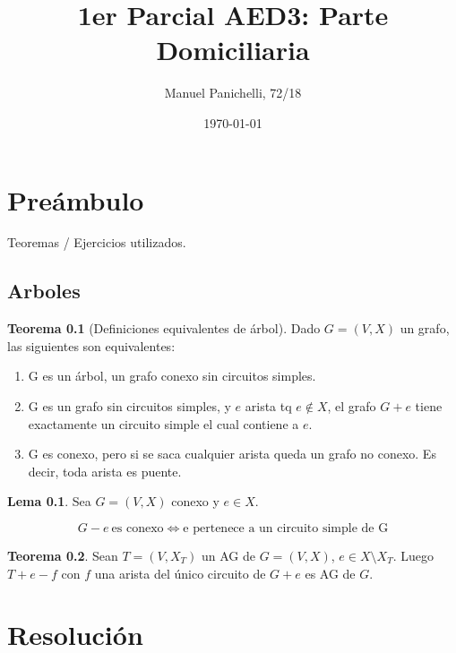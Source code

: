 \documentclass[12pt, a4paper]{report}
\title{1er Parcial AED3: Parte Domiciliaria}
\author{Manuel Panichelli, 72/18}
\date{\today}
\theoremstyle{definition} %
\newtheorem{theorem}{Teorema}
\newtheorem{lemma}{Lema}
\begin{document}
\maketitle
\newpage

\chapter*{Preámbulo}

Teoremas / Ejercicios utilizados.

\section{Arboles}

\begin{theorem}[Definiciones equivalentes de árbol]\label{teo:tree-equiv}
    Dado $G = (V, X)$ un grafo, las siguientes son equivalentes:

    \begin{enumerate}
        \item G es un árbol, un grafo conexo sin circuitos simples.
        \item G es un grafo sin circuitos simples, y $e$ arista tq $e \notin X$,
        el grafo $G + e$ tiene exactamente un circuito simple el cual contiene a
        $e$.\label{teo:tree-equiv-circ}
        \item G es conexo, pero si se saca cualquier arista queda un grafo no
        conexo. Es decir, toda arista es puente.\label{teo:tree-equiv-puentes}
    \end{enumerate}
\end{theorem}

\begin{lemma}\label{lema:tree-g-e}
    Sea $G = (V, X)$ conexo y $e \in X$.

    \[ G - e \ \text{es conexo} \iff \text{e pertenece a un circuito simple de G} \]
\end{lemma}

\begin{theorem}\label{teo:tree-t-e-f}
    Sean $T = (V, X_T)$ un AG de $G = (V, X)$, $e \in X \setminus X_T$. Luego $T + e - f$ con $f$ una arista del único circuito de $G+e$ es AG de $G$.
\end{theorem}

\chapter*{Resolución}
\end{document}
